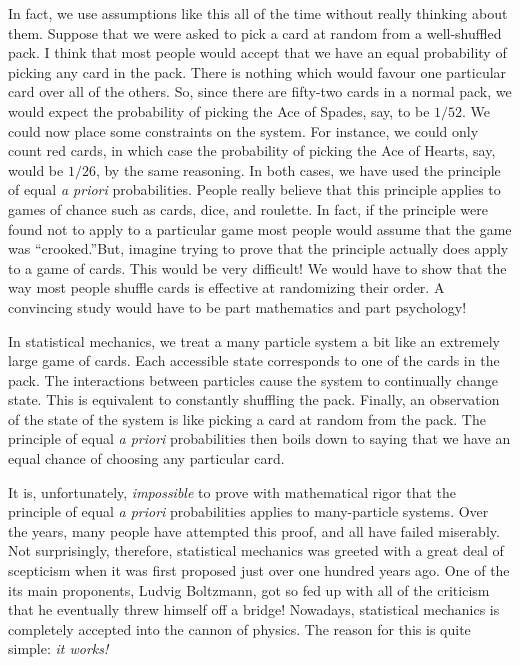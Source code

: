 In fact, we use assumptions like this all of the time without really thinking
about them. Suppose that we were asked to pick a card at random from a well-shuffled pack. I think that most people would accept that we have
an equal probability of picking any card in the pack. There is nothing which
would favour  one particular card over all of the others. So, since there are fifty-two cards in
a normal  pack, we would expect the probability of picking the Ace of Spades, say, to
be $1/52$. We could now place some constraints on the system. 
For instance, we could only count red cards, in which case the  probability
of picking the Ace of Hearts, say, would be $1/26$, by the same
reasoning. In both cases, we have used the principle of equal {\em a priori}
probabilities. People really believe that this principle applies to games
of chance such as cards, dice, and  roulette. In fact, if 
the principle were  found not to apply to a particular game most people would
assume that the game was ``crooked.''\@ But, imagine trying to prove 
that the
principle actually  does apply to a game of cards. This would be very difficult! 
We would have to show that the way most people shuffle cards is effective
at randomizing their order. A convincing study would have to  be
part mathematics and part psychology!

In statistical mechanics, we treat a many particle system a bit like an
extremely
large game of cards. Each accessible state corresponds to one of the
cards in the pack. The interactions between particles cause the system to
continually change state. This is equivalent to constantly shuffling the
pack. Finally, an observation of the state of the system is like picking
a card at random from the pack. The principle of equal {\em a priori}
probabilities then boils down to saying that we have an equal  chance of
choosing  any particular card.

It is, unfortunately, {\em impossible}\/ to prove with mathematical rigor that the
principle of equal {\em a priori}\/ probabilities applies to many-particle systems. Over the years, many people have attempted 
 this proof, and all have failed miserably. 
Not surprisingly, therefore, statistical mechanics was greeted with a 
great deal
of scepticism when it was first
proposed just over one hundred years ago. One of the its main proponents, 
Ludvig Boltzmann, got so fed up with all of the criticism that he eventually
threw himself off a bridge! 
Nowadays, statistical mechanics is completely accepted into the cannon
of physics. The reason for this
is quite simple: {\em it works!}

